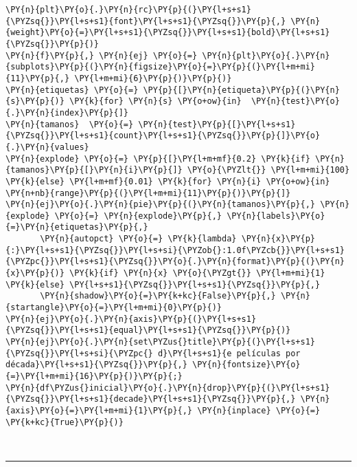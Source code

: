 \begin{tcolorbox}[breakable, size=fbox, boxrule=1pt, pad at break*=1mm,colback=cellbackground, colframe=cellborder]
\begin{Verbatim}[commandchars=\\\{\}]
\PY{n}{plt}\PY{o}{.}\PY{n}{rc}\PY{p}{(}\PY{l+s+s1}{\PYZsq{}}\PY{l+s+s1}{font}\PY{l+s+s1}{\PYZsq{}}\PY{p}{,} \PY{n}{weight}\PY{o}{=}\PY{l+s+s1}{\PYZsq{}}\PY{l+s+s1}{bold}\PY{l+s+s1}{\PYZsq{}}\PY{p}{)}
\PY{n}{f}\PY{p}{,} \PY{n}{ej} \PY{o}{=} \PY{n}{plt}\PY{o}{.}\PY{n}{subplots}\PY{p}{(}\PY{n}{figsize}\PY{o}{=}\PY{p}{(}\PY{l+m+mi}{11}\PY{p}{,} \PY{l+m+mi}{6}\PY{p}{)}\PY{p}{)}
\PY{n}{etiquetas} \PY{o}{=} \PY{p}{[}\PY{n}{etiqueta}\PY{p}{(}\PY{n}{s}\PY{p}{)} \PY{k}{for} \PY{n}{s} \PY{o+ow}{in}  \PY{n}{test}\PY{o}{.}\PY{n}{index}\PY{p}{]}
\PY{n}{tamanos}  \PY{o}{=} \PY{n}{test}\PY{p}{[}\PY{l+s+s1}{\PYZsq{}}\PY{l+s+s1}{count}\PY{l+s+s1}{\PYZsq{}}\PY{p}{]}\PY{o}{.}\PY{n}{values}
\PY{n}{explode} \PY{o}{=} \PY{p}{[}\PY{l+m+mf}{0.2} \PY{k}{if} \PY{n}{tamanos}\PY{p}{[}\PY{n}{i}\PY{p}{]} \PY{o}{\PYZlt{}} \PY{l+m+mi}{100} \PY{k}{else} \PY{l+m+mf}{0.01} \PY{k}{for} \PY{n}{i} \PY{o+ow}{in} \PY{n+nb}{range}\PY{p}{(}\PY{l+m+mi}{11}\PY{p}{)}\PY{p}{]}
\PY{n}{ej}\PY{o}{.}\PY{n}{pie}\PY{p}{(}\PY{n}{tamanos}\PY{p}{,} \PY{n}{explode} \PY{o}{=} \PY{n}{explode}\PY{p}{,} \PY{n}{labels}\PY{o}{=}\PY{n}{etiquetas}\PY{p}{,}
       \PY{n}{autopct} \PY{o}{=} \PY{k}{lambda} \PY{n}{x}\PY{p}{:}\PY{l+s+s1}{\PYZsq{}}\PY{l+s+si}{\PYZob{}:1.0f\PYZcb{}}\PY{l+s+s1}{\PYZpc{}}\PY{l+s+s1}{\PYZsq{}}\PY{o}{.}\PY{n}{format}\PY{p}{(}\PY{n}{x}\PY{p}{)} \PY{k}{if} \PY{n}{x} \PY{o}{\PYZgt{}} \PY{l+m+mi}{1} \PY{k}{else} \PY{l+s+s1}{\PYZsq{}}\PY{l+s+s1}{\PYZsq{}}\PY{p}{,}
       \PY{n}{shadow}\PY{o}{=}\PY{k+kc}{False}\PY{p}{,} \PY{n}{startangle}\PY{o}{=}\PY{l+m+mi}{0}\PY{p}{)}
\PY{n}{ej}\PY{o}{.}\PY{n}{axis}\PY{p}{(}\PY{l+s+s1}{\PYZsq{}}\PY{l+s+s1}{equal}\PY{l+s+s1}{\PYZsq{}}\PY{p}{)}
\PY{n}{ej}\PY{o}{.}\PY{n}{set\PYZus{}title}\PY{p}{(}\PY{l+s+s1}{\PYZsq{}}\PY{l+s+si}{\PYZpc{} d}\PY{l+s+s1}{e películas por década}\PY{l+s+s1}{\PYZsq{}}\PY{p}{,} \PY{n}{fontsize}\PY{o}{=}\PY{l+m+mi}{16}\PY{p}{)}\PY{p}{;}
\PY{n}{df\PYZus{}inicial}\PY{o}{.}\PY{n}{drop}\PY{p}{(}\PY{l+s+s1}{\PYZsq{}}\PY{l+s+s1}{decade}\PY{l+s+s1}{\PYZsq{}}\PY{p}{,} \PY{n}{axis}\PY{o}{=}\PY{l+m+mi}{1}\PY{p}{,} \PY{n}{inplace} \PY{o}{=} \PY{k+kc}{True}\PY{p}{)}
\end{Verbatim}
\end{tcolorbox}

    \begin{center}
    \end{center}
    { \hspace*{\fill} \\}
    
    \begin{center}\rule{0.5\linewidth}{0.5pt}\end{center}

